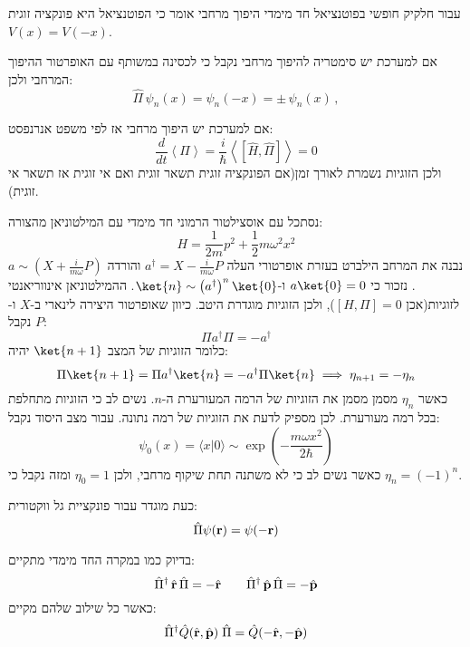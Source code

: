 \documentclass{tstextbook}
\begin{document}
\begin{remark}
עבור חלקיק חופשי בפוטנציאל חד מימדי היפוך מרחבי אומר כי הפוטנציאל היא פונקציה זוגית \(V(x)=V(-x)\).

\end{remark}
\begin{proposition}
אם למערכת יש סימטריה להיפוך מרחבי נקבל כי לכסינה במשותף עם האופרטור ההיפוך המרחבי ולכן:
$$\hat{\Pi}\,\psi_{n}(x)=\psi_{n}(-x)=\pm\,\psi_{n}(x)\,,$$

\end{proposition}
\begin{proposition}
אם למערכת יש היפוך מרחבי אז לפי משפט אנרנפסט:
$$\frac{d}{d t}\left<\Pi\right>=\frac{i}{\hbar}\left<\left[\hat{H},\hat{\Pi}\right]\right>=0$$
ולכן הזוגיות נשמרת לאורך זמן(אם הפונקציה זוגית תשאר זוגית ואם אי זוגית אז תשאר אי זוגית).

\end{proposition}
\begin{example}
נסתכל עם אוסצילטור הרמוני חד מימדי עם המילטוניאן מהצורה:
$$H=\frac{1}{2m}p^{2}+\frac{1}{2}m\omega^{2}x^{2}$$
נבנה את המרחב הילברט בעזרת אופרטורי העלה \(a^{\dagger}=X-\frac{i}{m\omega}P\) והורדה \(a \sim \left( X+\frac{i}{m\omega}P \right)\). נזכור כי \(a\ket{0}=0\) ו-\(\ket{n}\sim\left( a^{\dagger} \right)^{n}\ket{0}\).
ההמילטוניאן אינווריאנטי לזוגיות(אכן \(\left[ H,\Pi \right]=0\)), ולכן הזוגיות מוגדרת היטב. כיוון שאופרטור היצירה לינארי ב-\(X\) ו-\(P\) נקבל:
$$\Pi a^{\dagger}\Pi=-a^{\dagger}$$
כלומר הזוגיות של המצב \(\ket{n+1}\) יהיה:
$$\Pi \ket{n+1} =\Pi a^{\dagger}\ket{n} =-a^{\dagger}\Pi \ket{n} \implies \eta_{n+1}=-\eta_{n}$$
כאשר \(\eta_{n}\) מסמן מסמן את הזוגיות של הרמה המעורערת ה-\(n\). נשים לב כי הזוגיות מתחלפת בכל רמה מעורערת. לכן מספיק לדעת את הזוגיות של רמה נתונה. עבור מצב היסוד נקבל:
$$\psi_{0}(x)=\langle x|0\rangle\sim\exp\left(-{\frac{m\omega x^{2}}{2\hbar}}\right)$$
כאשר נשים לב כי לא משתנה תחת שיקוף מרחבי, ולכן \(\eta_{0}=1\) ומזה נקבל כי \(\eta_{n}=(-1)^{n}\).

\end{example}
\begin{definition}
כעת מוגדר עבור פונקציית גל ווקטורית:
$$\hat{\Pi}\psi({\bf r})=\psi(-{\bf r})$$

\end{definition}
\begin{corollary}
בדיוק כמו במקרה החד מימדי מתקיים:
$$\hat{\Pi}^{\dagger}\,\hat{\mathbf{r}}\,\hat{\Pi}=-\hat{\mathbf{r}}\qquad \hat{\Pi}^{\dagger}\,\hat{\bf p}\,\hat{\Pi}=-\hat{\bf p}$$
כאשר כל שילוב שלהם מקיים:
$$\hat{\Pi}^{\dagger}\hat{Q}(\hat{\bf r},\hat{\bf p})\;\hat{\Pi}=\hat{Q}(-\hat{\bf r},-\hat{\bf p})$$

\end{corollary}
\end{document}
